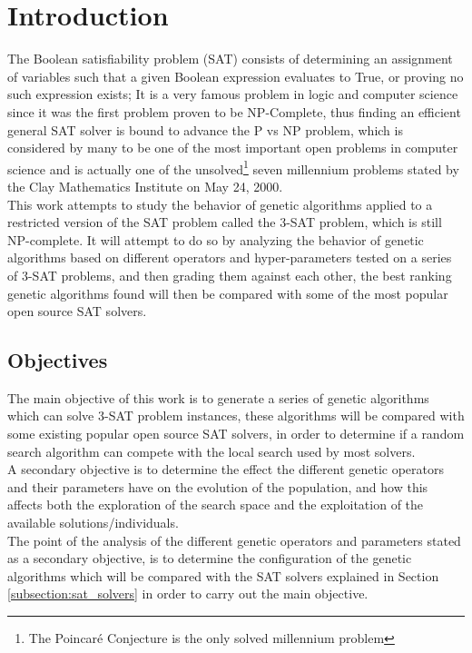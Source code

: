 \section{Introduction}
\label{section:introduction}

The Boolean satisfiability problem (SAT) consists of determining an assignment of variables such that a given Boolean expression evaluates to True, or proving no such expression exists; It is a very famous problem in logic and computer science since it was the first problem proven to be NP-Complete, thus finding an efficient general SAT solver is bound to advance the P vs NP problem, which is considered by many to be one of the most important open problems in computer science and is actually one of the unsolved\footnote{The Poincaré Conjecture is the only solved millennium problem} seven millennium problems stated by the Clay Mathematics Institute on May 24, 2000. 
\\This work attempts to study the behavior of genetic algorithms applied to a restricted version of the SAT problem called the 3-SAT problem, which is still NP-complete. It will attempt to do so by analyzing the behavior of genetic algorithms based on different operators and hyper-parameters tested on a series of 3-SAT problems, and then grading them against each other, the best ranking genetic algorithms found will then be compared with some of the most popular open source SAT solvers.

\subsection {Objectives}

The main objective of this work is to generate a series of genetic algorithms which can solve 3-SAT problem instances, these algorithms will be compared with some existing popular open source SAT solvers, in order to determine if a random search algorithm can compete with the local search used by most solvers.
\\A secondary objective is to determine the effect the different genetic operators and their parameters have on the evolution of the population, and how this affects both the exploration of the search space and the exploitation of the available solutions/individuals.
\\The point of the analysis of the different genetic operators and parameters stated as a secondary objective, is to determine the configuration of the genetic algorithms which will be compared with the SAT solvers explained in Section \ref{subsection:sat_solvers} in order to carry out the main objective.


